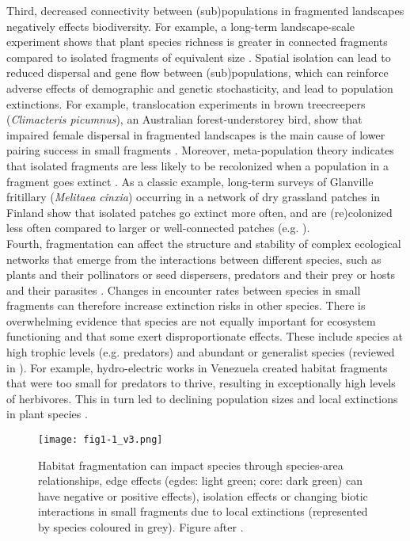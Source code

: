 \documentclass[10pt, twoside]{book} %
\begin{document}
Third, decreased connectivity between (sub)populations in fragmented landscapes negatively effects biodiversity. For example, a long-term landscape-scale experiment shows that plant species richness is greater in connected fragments compared to isolated fragments of equivalent size \citep{Haddad2017}. Spatial isolation can lead to reduced dispersal and gene flow between (sub)populations, which can reinforce adverse effects of demographic and genetic stochasticity, and lead to population extinctions. For example, translocation experiments in brown treecreepers (\textit{Climacteris picumnus}), an Australian forest-understorey bird, show that impaired female dispersal in fragmented landscapes is the main cause of lower pairing success in small fragments \citep{Cooper2002}. Moreover, meta-population theory indicates that isolated fragments are less likely to be recolonized when a population in a fragment goes extinct \citep{Hanski1998, Hanski1999}. As a classic example, long-term surveys of Glanville fritillary (\textit{Melitaea cinxia}) occurring in a network of dry grassland patches in Finland show that isolated patches go extinct more often, and are (re)colonized less often compared to larger or well-connected patches (e.g. \citealt{Hanski2017}).\\

Fourth, fragmentation can affect the structure and stability of complex ecological networks that emerge from the interactions between different species, such as plants and their pollinators or seed dispersers, predators and their prey or hosts and their parasites \citep{Hagen2012, Grass2018}. Changes in encounter rates between species in small fragments can therefore increase extinction risks in other species. There is overwhelming evidence that species are not equally important for ecosystem functioning and that some exert disproportionate effects. These include species at high trophic levels (e.g. predators) and abundant or generalist species (reviewed in \citealt{Hagen2012}). For example, hydro-electric works in Venezuela created habitat fragments that were too small for predators to thrive, resulting in exceptionally high levels of herbivores. This in turn led to declining population sizes and local extinctions in plant species \citep{Terborgh2001, Terborgh2006}.\\
	
	
	\begin{figure}[th!]
	\begin{center}
		\texttt{[image: fig1-1\_v3.png]}
	\end{center}
		\caption{Habitat fragmentation can impact species through species-area relationships, edge effects (egdes: light green; core: dark green) can have negative or positive effects), isolation effects or changing biotic interactions in small fragments due to local extinctions (represented by species coloured in grey). Figure after \citep{Boeraeve2019}.  \label{fig1-1}}
	\end{figure}
\clearpage	
	
\end{document}
